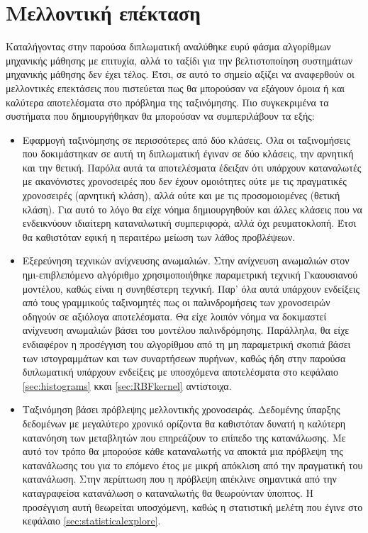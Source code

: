 \section{Μελλοντική επέκταση}
Καταλήγοντας στην παρούσα διπλωματική αναλύθηκε ευρύ φάσμα αλγορίθμων μηχανικής μάθησης με επιτυχία, αλλά το ταξίδι για την βελτιστοποίηση συστημάτων μηχανικής μάθησης δεν έχει τέλος. Έτσι, σε αυτό το σημείο αξίζει να αναφερθούν οι μελλοντικές επεκτάσεις που πιστεύεται πως θα μπορούσαν να εξάγουν όμοια ή και καλύτερα αποτελέσματα στο πρόβλημα της ταξινόμησης. Πιο συγκεκριμένα τα συστήματα που δημιουργήθηκαν θα μπορούσαν να συμπεριλάβουν τα εξής:
\begin{itemize}
\item Εφαρμογή ταξινόμησης σε περισσότερες από δύο κλάσεις. Όλα οι ταξινομήσεις που δοκιμάστηκαν σε αυτή τη διπλωματική έγιναν σε δύο κλάσεις, την αρνητική και την θετική. Παρόλα αυτά τα αποτελέσματα έδειξαν ότι υπάρχουν καταναλωτές με ακανόνιστες χρονοσειρές που δεν έχουν ομοιότητες ούτε με τις πραγματικές χρονοσειρές (αρνητική κλάση), αλλά ούτε και με τις προσομοιομένες (θετική κλάση). Για αυτό το λόγο θα είχε νόημα δημιουργηθούν και άλλες κλάσεις που να ενδεικνύουν ιδιαίτερη καταναλωτική συμπεριφορά, αλλά όχι ρευματοκλοπή. Έτσι θα καθιστόταν εφική η περαιτέρω μείωση των λάθος προβλέψεων.
\item Εξερεύνηση τεχνικών ανίχνευσης ανωμαλιών. Στην ανίχνευση ανωμαλιών στον ημι-επιβλεπόμενο αλγόριθμο χρησιμοποιήθηκε παραμετρική τεχνική Γκαουσιανού μοντέλου, καθώς είναι η συνηθέστερη τεχνική. Παρ' όλα αυτά υπάρχουν ενδείξεις από τους γραμμικούς ταξινομητές πως οι παλινδρομήσεις των χρονοσειρών οδηγούν σε αξιόλογα αποτελέσματα. Θα είχε λοιπόν νόημα να δοκιμαστεί ανίχνευση ανωμαλιών βάσει του μοντέλου παλινδρόμησης. Παράλληλα, θα είχε ενδιαφέρον η προσέγγιση του αλγορίθμου από τη μη παραμετρική σκοπιά βάσει των ιστογραμμάτων και των συναρτήσεων πυρήνων, καθώς ήδη στην παρούσα διπλωματική υπάρχουν ενδείξεις με υποσχόμενα αποτελέσματα στο κεφάλαιο \ref{sec:histograms} κκαι \ref{sec:RBFkernel} αντίστοιχα.
\item Ταξινόμηση βάσει πρόβλεψης μελλοντικής χρονοσειράς. Δεδομένης ύπαρξης δεδομένων με μεγαλύτερο χρονικό ορίζοντα θα καθιστόταν δυνατή η καλύτερη κατανόηση των μεταβλητών που επηρεάζουν το επίπεδο της κατανάλωσης. Με αυτό τον τρόπο θα μπορούσε κάθε καταναλωτής να αποκτά μια πρόβλεψη της κατανάλωσης του για το επόμενο έτος με μικρή απόκλιση από την πραγματική του κατανάλωση. Στην περίπτωση που η πρόβλεψη απέκλινε σημαντικά από την καταγραφείσα κατανάλωση ο καταναλωτής θα θεωρούνταν ύποπτος. Η προσέγγιση αυτή θεωρείται υποσχόμενη, καθώς η στατιστική μελέτη που έγινε στο κεφάλαιο \ref{sec:statisticalexplore}.
\end{itemize} 